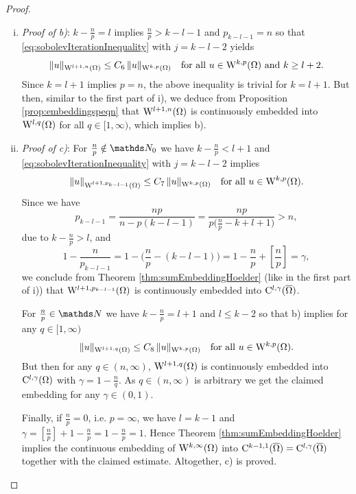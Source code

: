 \begin{proof}
\begin{enumerate}[i)]
\item \emph{Proof of b)}:
  $k - \frac{n}{p} = l$ implies $\frac{n}{p} > k - l - 1$ and $p_{k - l - 1} = n$ so that \eqref{eq:sobolevIterationInequality} with $j = k - l - 2$ yields
  $$
  \|u\|_{\mathrm{W}^{l + 1, n}(\Omega)} \leq C_6 \, \|u\|_{\mathrm{W}^{k,p}(\Omega)} \quad\text{for all } u \in \mathrm{W}^{k,p}(\Omega) \text{ and } k \geq l + 2.
  $$
  Since $k = l+1$ implies $p = n$, the above inequality is trivial for $k = l + 1$.
  But then, similar to the first part of i), we deduce from Proposition \ref{prop:embeddingspeqn} that $\mathrm{W}^{l+1,n}(\Omega)$ is continuously embedded into $\mathrm{W}^{l,q}(\Omega)$ for all $q \in [1,\infty)$, which implies b).
    
  \item \emph{Proof of c)}: For $\frac{n}{p} \notin\N_0$ we have $k - \frac{n}{p} < l + 1$ and \eqref{eq:sobolevIterationInequality} with $j = k - l - 2$ implies
    $$
  \|u\|_{\mathrm{W}^{l+1,p_{k - l - 1}}(\Omega)} \leq C_7 \, \|u\|_{\mathrm{W}^{k,p}(\Omega)} \quad\text{for all } u \in \mathrm{W}^{k,p}(\Omega).
    $$
    Since we have 
    $$
    p_{k - l - 1} = \frac{np}{n - p(k - l - 1)} = \frac{np}{p\Big( \frac{n}{p} - k + l + 1 \Big)} > n,
    $$ 
    due to $k - \frac{n}{p} > l$, and 
    $$
    1 - \frac{n}{p_{k - l - 1}} 
    = 1 - \Big(\frac{n}{p} - (k - l - 1)\Big)
    = 1 - \frac{n}{p} + \left[ \frac{n}{p} \right]
    = \gamma,
    $$
    we conclude from Theorem \ref{thm:sumEmbeddingHoelder} (like in the first part of i)) that $\mathrm{W}^{l+1,p_{k - l - 1}}(\Omega)$ is continuously embedded into $\mathrm{C}^{l,\gamma}(\overline\Omega)$.

    For $\frac{n}{p} \in \N$ we have $k - \frac{n}{p} = l + 1$ and $l \leq k - 2$ so that b) implies for any $q \in [1,\infty)$
      $$
      \|u\|_{\mathrm{W}^{l+1,q}(\Omega)} \leq C_8 \, \|u\|_{\mathrm{W}^{k,p}(\Omega)} \quad\text{for all } u \in \mathrm{W}^{k,p}(\Omega).
      $$
      But then for any $q \in (n,\infty)$, $\mathrm{W}^{l+1,q}(\Omega)$ is continuously embedded into $\mathrm{C}^{l,\gamma}(\Omega)$ with $\gamma = 1 - \frac{n}{q}$.
      As $q \in (n,\infty)$ is arbitrary we get the claimed embedding for any $\gamma \in (0,1)$.

      Finally, if $\frac{n}{p} = 0$, i.e. $p = \infty$, we have $l = k - 1$ and $\gamma = \left[ \frac{n}{p} \right] + 1 - \frac{n}{p} = 1 - \frac{n}{p} = 1$.
      Hence Theorem \ref{thm:sumEmbeddingHoelder} implies the continuous embedding of $\mathrm{W}^{k,\infty}(\Omega)$ into $\mathrm{C}^{k-1,1}(\overline\Omega) = \mathrm{C}^{l,\gamma}(\overline\Omega)$ together with the claimed estimate.
      Altogether, c) is proved. \qedhere
  \end{enumerate}
\end{proof}

